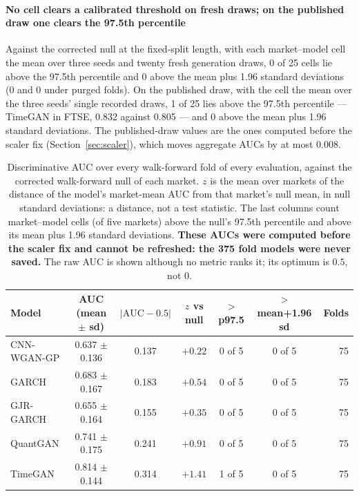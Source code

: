 \documentclass[11pt,a4paper]{article}
\makeatletter
\DeclareRobustCommand{\_}{\ifmmode\nfss@text{\textunderscore}\else\textunderscore\allowbreak\fi}
\makeatother
\begin{document}
\paragraph{No cell clears a calibrated threshold on fresh draws; on the published draw one clears the 97.5th percentile} Against the corrected null at the fixed-split length, with each market--model cell the mean over three seeds and twenty fresh generation draws, 0 of 25 cells lie above the 97.5th percentile and 0 above the mean plus 1.96 standard deviations (0 and 0 under purged folds). On the published draw, with the cell the mean over the three seeds' single recorded draws, 1 of 25 lies above the 97.5th percentile --- TimeGAN in FTSE, 0.832 against 0.805 --- and 0 above the mean plus 1.96 standard deviations. The published-draw values are the ones computed before the scaler fix (Section~\ref{sec:scaler}), which moves aggregate AUCs by at most 0.008.

\begin{table}[htbp]
\centering
\caption{Discriminative AUC over every walk-forward fold of every evaluation, against the corrected walk-forward null of each market. $z$ is the mean over markets of the distance of the model's market-mean AUC from that market's null mean, in null standard deviations: a distance, not a test statistic. The last columns count market--model cells (of five markets) above the null's 97.5th percentile and above its mean plus 1.96 standard deviations. \textbf{These AUCs were computed before the scaler fix and cannot be refreshed: the 375 fold models were never saved.} The raw AUC is shown although no metric ranks it; its optimum is $0.5$, not $0$.}
\label{tab:auc}
\begin{tabular}{@{}lcccccr@{}}
\toprule
Model & AUC (mean $\pm$ sd) & $|\mathrm{AUC}-0.5|$ & $z$ vs null & $>$ p97.5 & $>$ mean+1.96 sd & Folds \\
\midrule
CNN-WGAN-GP & 0.637 $\pm$ 0.136 & 0.137 & $+0.22$ & 0 of 5 & 0 of 5 & 75 \\
GARCH & 0.683 $\pm$ 0.167 & 0.183 & $+0.54$ & 0 of 5 & 0 of 5 & 75 \\
GJR-GARCH & 0.655 $\pm$ 0.164 & 0.155 & $+0.35$ & 0 of 5 & 0 of 5 & 75 \\
QuantGAN & 0.741 $\pm$ 0.175 & 0.241 & $+0.91$ & 0 of 5 & 0 of 5 & 75 \\
TimeGAN & 0.814 $\pm$ 0.144 & 0.314 & $+1.41$ & 1 of 5 & 0 of 5 & 75 \\
\bottomrule
\end{tabular}
\end{table}
\end{document}
